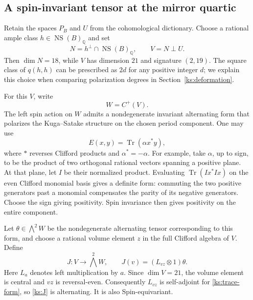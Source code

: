\documentclass[11pt]{article}
\numberwithin{equation}{section}
\theoremstyle{definition}
\theoremstyle{remark}
\newcommand{\Q}{\mathbb Q}
\DeclareMathOperator{\NS}{NS}
\begin{document}
\subsection{A spin-invariant tensor at the mirror quartic}
\label{ks:construction}

Retain the spaces $P_B$ and $U$ from the cohomological dictionary.
Choose a rational ample class $h\in\NS(B)_{\Q}$ and set
\[
 N=h^\perp\cap\NS(B)_{\Q},\qquad V=N\perp U.
\]
Then $\dim N=18$, while $V$ has dimension $21$ and signature
$(2,19)$.  The square class of $q(h,h)$ can be prescribed as
$2d$ for any positive integer $d$; we explain this choice when
comparing polarization degrees in Section~\ref{ks:deformation}.

For this $V$, write
\[
 W=C^+(V).
\]
The left spin action on $W$ admits a nondegenerate invariant
alternating form that polarizes the Kuga--Satake structure on
the chosen period component.  One may use
\begin{equation}
 \label{ks:trace-form}
 E(x,y)=\operatorname{Tr}(\alpha x^*y),
\end{equation}
where $*$ reverses Clifford products and $\alpha^*=-\alpha$.
For example, take $\alpha$, up to sign, to be the product of
two orthogonal rational vectors spanning a positive plane.
At that plane, let $I$ be their normalized product.  Evaluating
$\operatorname{Tr}(I x^* I x)$ on the even Clifford monomial
basis gives a definite form: commuting the two positive
generators past a monomial compensates the parity of its
negative generators.  Choose the sign giving positivity.
Spin invariance then gives positivity on the entire component.

Let $\theta\in\bigwedge^2W$ be the nondegenerate alternating
tensor corresponding to this form, and choose a rational volume
element $z$ in the full Clifford algebra of $V$.  Define
\begin{equation}
 \label{ks:J}
 J:V\longrightarrow\bigwedge^2W,
 \qquad J(v)=(L_{vz}\otimes1)\theta.
\end{equation}
Here $L_a$ denotes left multiplication by $a$.  Since $\dim V=21$,
the volume element is central and $vz$ is reversal-even.
Consequently $L_{vz}$ is self-adjoint for \eqref{ks:trace-form},
so \eqref{ks:J} is alternating.  It is also Spin-equivariant.
\end{document}
